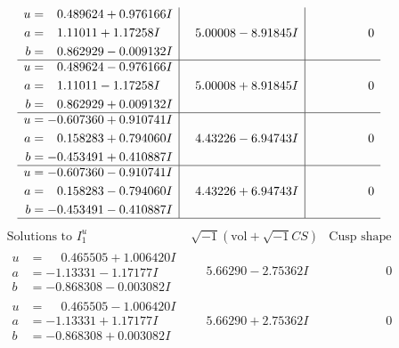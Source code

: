 \documentclass[1p]{elsarticle_modified}
\theoremstyle{definition}
\newcommand{\I}{\sqrt{-1}}
\begin{document}
$$\begin{array}{c|c|c}
\begin{aligned}
u &= \phantom{-}0.489624 + 0.976166 I \\
a &= \phantom{-}1.11011 + 1.17258 I \\
b &= \phantom{-}0.862929 - 0.009132 I\end{aligned}
 & \phantom{-}5.00008 - 8.91845 I & \phantom{-0.000000 } 0 \\ \hline\begin{aligned}
u &= \phantom{-}0.489624 - 0.976166 I \\
a &= \phantom{-}1.11011 - 1.17258 I \\
b &= \phantom{-}0.862929 + 0.009132 I\end{aligned}
 & \phantom{-}5.00008 + 8.91845 I & \phantom{-0.000000 } 0 \\ \hline\begin{aligned}
u &= -0.607360 + 0.910741 I \\
a &= \phantom{-}0.158283 + 0.794060 I \\
b &= -0.453491 + 0.410887 I\end{aligned}
 & \phantom{-}4.43226 - 6.94743 I & \phantom{-0.000000 } 0 \\ \hline\begin{aligned}
u &= -0.607360 - 0.910741 I \\
a &= \phantom{-}0.158283 - 0.794060 I \\
b &= -0.453491 - 0.410887 I\end{aligned}
 & \phantom{-}4.43226 + 6.94743 I & \phantom{-0.000000 } 0\\
 \hline 
 \end{array}$$\newpage$$\begin{array}{c|c|c}  
\text{Solutions to }I^u_{1}& \I (\text{vol} + \sqrt{-1}CS) & \text{Cusp shape}\\
 \hline 
\begin{aligned}
u &= \phantom{-}0.465505 + 1.006420 I \\
a &= -1.13331 - 1.17177 I \\
b &= -0.868308 - 0.003082 I\end{aligned}
 & \phantom{-}5.66290 - 2.75362 I & \phantom{-0.000000 } 0 \\ \hline\begin{aligned}
u &= \phantom{-}0.465505 - 1.006420 I \\
a &= -1.13331 + 1.17177 I \\
b &= -0.868308 + 0.003082 I\end{aligned}
 & \phantom{-}5.66290 + 2.75362 I & \phantom{-0.000000 } 0 \\ \hline\begin{aligned}

\end{aligned}
\end{array}$$
\end{document}
